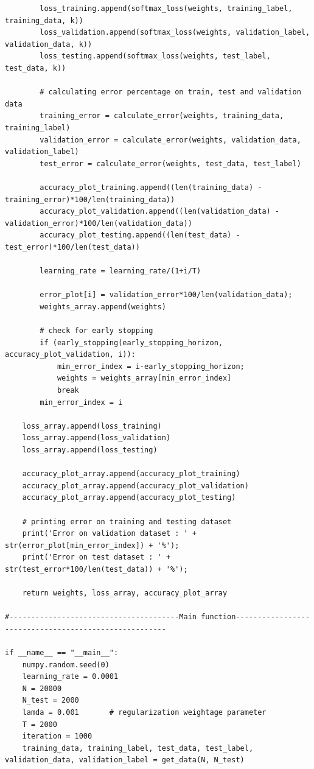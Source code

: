 \documentclass{article}
\begin{document}
\begin{lstlisting}
        loss_training.append(softmax_loss(weights, training_label, training_data, k))        
        loss_validation.append(softmax_loss(weights, validation_label, validation_data, k))
        loss_testing.append(softmax_loss(weights, test_label, test_data, k))
        
        # calculating error percentage on train, test and validation data
        training_error = calculate_error(weights, training_data, training_label)
        validation_error = calculate_error(weights, validation_data, validation_label)
        test_error = calculate_error(weights, test_data, test_label)
        
        accuracy_plot_training.append((len(training_data) - training_error)*100/len(training_data))
        accuracy_plot_validation.append((len(validation_data) - validation_error)*100/len(validation_data))
        accuracy_plot_testing.append((len(test_data) - test_error)*100/len(test_data))
        
        learning_rate = learning_rate/(1+i/T)
        
        error_plot[i] = validation_error*100/len(validation_data);
        weights_array.append(weights)        

        # check for early stopping
        if (early_stopping(early_stopping_horizon, accuracy_plot_validation, i)):
            min_error_index = i-early_stopping_horizon;
            weights = weights_array[min_error_index]            
            break
        min_error_index = i
        
    loss_array.append(loss_training)
    loss_array.append(loss_validation)
    loss_array.append(loss_testing)
        
    accuracy_plot_array.append(accuracy_plot_training)
    accuracy_plot_array.append(accuracy_plot_validation)
    accuracy_plot_array.append(accuracy_plot_testing)
    
    # printing error on training and testing dataset
    print('Error on validation dataset : ' + str(error_plot[min_error_index]) + '%');
    print('Error on test dataset : ' + str(test_error*100/len(test_data)) + '%');

    return weights, loss_array, accuracy_plot_array
    
#---------------------------------------Main function------------------------------------------------------

if __name__ == "__main__":        
    numpy.random.seed(0)
    learning_rate = 0.0001
    N = 20000
    N_test = 2000
    lamda = 0.001       # regularization weightage parameter
    T = 2000
    iteration = 1000
    training_data, training_label, test_data, test_label, validation_data, validation_label = get_data(N, N_test)
    

\end{lstlisting}
\end{document}
